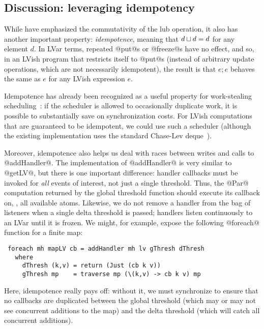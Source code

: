 \subsection{Discussion: leveraging idempotency}\label{subsection:lvish-discussion-leveraging-idempotency}

While  have emphasized the commutativity of the lub operation, it
also has another important property: \emph{idempotence}, meaning that
$d \sqcup d = d$ for any element $d$.  In LVar terms, repeated
@put@s or @freeze@s have no effect, and so, in an LVish program that
restricts itself to @put@s (instead of arbitrary update operations,
which are not necessarily idempotent), the result is that $e; e$
behaves the same as $e$ for any LVish expression $e$.

Idempotence has already been recognized as a useful property for
work-stealing scheduling~\cite{idempotent}: if the scheduler is
allowed to occasionally duplicate work, it is possible to
substantially save on synchronization costs.  For LVish computations
that are guaranteed to be idempotent, we could use such a scheduler
(although the existing implementation uses the standard Chase-Lev
deque~\cite{ChaseLev}).

Moreover, idempotence also helps us deal with races between writes and
calls to @addHandler@.  The implementation of @addHandler@ is very
similar to @getLV@, but there is one important difference: handler
callbacks must be invoked for \emph{all} events of interest, not just
a single threshold.  Thus, the @Par@ computation returned by the
global threshold function should execute its callback on, \eg, all
available atoms.  Likewise, we do not remove a handler from the bag of
listeners when a single delta threshold is passed; handlers listen
continuously to an LVar until it is frozen.  We might, for example,
expose the following @foreach@ function for a finite map:

\singlespacing
\begin{lstlisting}
 foreach mh mapLV cb = addHandler mh lv gThresh dThresh
   where
     dThresh (k,v) = return (Just (cb k v))
     gThresh mp    = traverse mp (\(k,v) -> cb k v) mp
\end{lstlisting}
\doublespacing

Here, idempotence really pays off: without it, we must synchronize to
ensure that no callbacks are duplicated between the global threshold
(which may or may not see concurrent additions to the map) and the
delta threshold (which will catch all concurrent additions).

